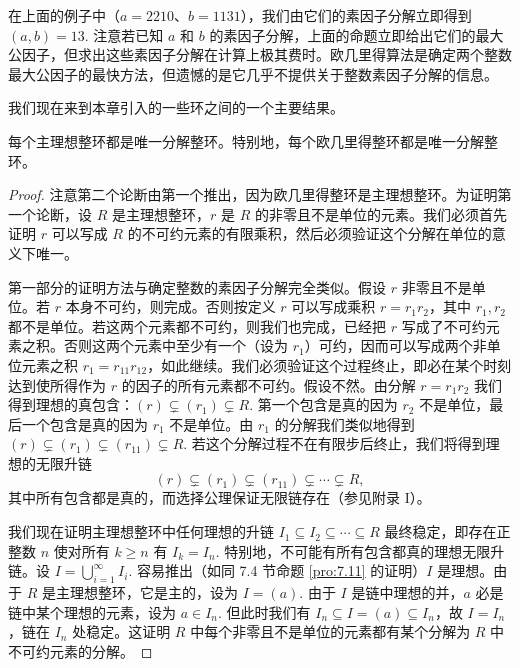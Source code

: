 \begin{example}
在上面的例子中（\(a = 2210\)、\(b = 1131\)），我们由它们的素因子分解立即得到 \((a, b) = 13\). 注意若已知 \(a\) 和 \(b\) 的素因子分解，上面的命题立即给出它们的最大公因子，但求出这些素因子分解在计算上极其费时。欧几里得算法是确定两个整数最大公因子的最快方法，但遗憾的是它几乎不提供关于整数素因子分解的信息。
\end{example}

我们现在来到本章引入的一些环之间的一个主要结果。

\begin{theorem}\label{thm:8.14}
每个主理想整环都是唯一分解整环。特别地，每个欧几里得整环都是唯一分解整环。
\end{theorem}

\begin{proof}
注意第二个论断由第一个推出，因为欧几里得整环是主理想整环。为证明第一个论断，设 \(R\) 是主理想整环，\(r\) 是 \(R\) 的非零且不是单位的元素。我们必须首先证明 \(r\) 可以写成 \(R\) 的不可约元素的有限乘积，然后必须验证这个分解在单位的意义下唯一。

第一部分的证明方法与确定整数的素因子分解完全类似。假设 \(r\) 非零且不是单位。若 \(r\) 本身不可约，则完成。否则按定义 \(r\) 可以写成乘积 \(r = r_1r_2\)，其中 \(r_1, r_2\) 都不是单位。若这两个元素都不可约，则我们也完成，已经把 \(r\) 写成了不可约元素之积。否则这两个元素中至少有一个（设为 \(r_1\)）可约，因而可以写成两个非单位元素之积 \(r_1 = r_{11}r_{12}\)，如此继续。我们必须验证这个过程终止，即必在某个时刻达到使所得作为 \(r\) 的因子的所有元素都不可约。假设不然。由分解 \(r = r_1r_2\) 我们得到理想的真包含：\((r) \subsetneq (r_1) \subsetneq R\). 第一个包含是真的因为 \(r_2\) 不是单位，最后一个包含是真的因为 \(r_1\) 不是单位。由 \(r_1\) 的分解我们类似地得到 \((r) \subsetneq (r_1) \subsetneq (r_{11}) \subsetneq R\). 若这个分解过程不在有限步后终止，我们将得到理想的无限升链
\[
(r) \subsetneq (r_1) \subsetneq (r_{11}) \subsetneq \cdots \subsetneq R,
\]
其中所有包含都是真的，而选择公理保证无限链存在（参见附录 I）。

我们现在证明主理想整环中任何理想的升链 \(I_1 \subseteq I_2 \subseteq \cdots \subseteq R\) 最终稳定，即存在正整数 \(n\) 使对所有 \(k \geq n\) 有 \(I_k = I_n\). 特别地，不可能有所有包含都真的理想无限升链。设 \(I = \bigcup_{i=1}^{\infty} I_i\). 容易推出（如同 7.4 节命题 \ref{pro:7.11} 的证明）\(I\) 是理想。由于 \(R\) 是主理想整环，它是主的，设为 \(I = (a)\). 由于 \(I\) 是链中理想的并，\(a\) 必是链中某个理想的元素，设为 \(a \in I_n\). 但此时我们有 \(I_n \subseteq I = (a) \subseteq I_n\)，故 \(I = I_n\)，链在 \(I_n\) 处稳定。这证明 \(R\) 中每个非零且不是单位的元素都有某个分解为 \(R\) 中不可约元素的分解。


\end{proof}
